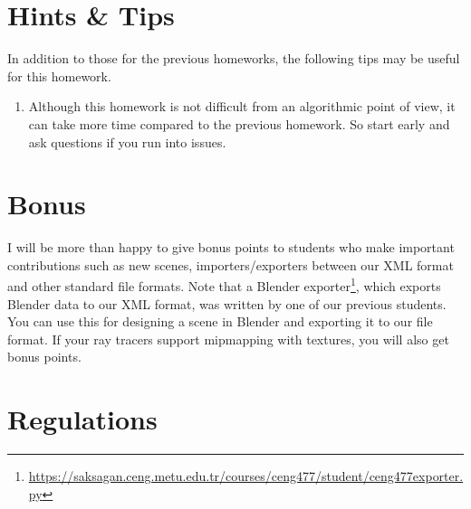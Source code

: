 \documentclass[12pt]{article}
\begin{document}
\section{Hints \& Tips}
In addition to those for the previous homeworks, the following tips may
be useful for this homework.

\begin{enumerate}
\item \textbf{} Although this homework is not difficult from an
algorithmic point of view, it can take more time compared to the
previous homework. So start early and ask questions if you run into
issues.

\end{enumerate}

\section{Bonus}

I will be more than happy to give bonus points to students who
make important contributions such as new scenes, importers/exporters
between our XML format and other standard file formats. Note that a
Blender
exporter\footnote{\url{https://saksagan.ceng.metu.edu.tr/courses/ceng477/student/ceng477exporter.py}},
which exports Blender data to our XML format, was written by one of our
previous students. You can use this for designing a scene in Blender and
exporting it to our file format. If your ray tracers support mipmapping
with textures, you will also get bonus points.

\section{Regulations}
\end{document}
